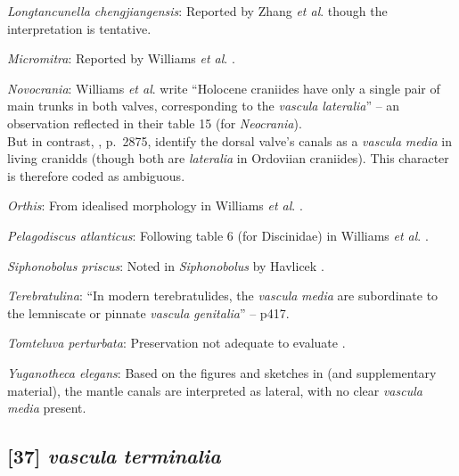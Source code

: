 \documentclass[openany]{book}
\theoremstyle{definition}
\theoremstyle{definition}
\theoremstyle{definition}
\theoremstyle{remark}
\begin{document}
\hypertarget{Longtancunella_chengjiangensis-coding-36}{}
\emph{Longtancunella chengjiangensis}: Reported by Zhang \emph{et al}.
\citeyearpar{Zhang2007Agregarious} though the interpretation is
tentative.

\hypertarget{Micromitra-coding-36}{}
\emph{Micromitra}: Reported by Williams \emph{et al}.
\citeyearpar{Williams1998Thediversity}.

\hypertarget{Novocrania-coding-36}{}
\emph{Novocrania}: Williams \emph{et al}.
\citeyearpar{Williams2000LinguliformeaCraniiformea} write ``Holocene
craniides have only a single pair of main trunks in both valves,
corresponding to the \emph{vascula} \emph{lateralia}'' -- an observation
reflected in their table 15 (for \emph{Neocrania}).\\
But in contrast, \citet{Williams2007Supplement}, p.~2875, identify the
dorsal valve's canals as a \emph{vascula} \emph{media} in living
cranidds (though both are \emph{lateralia} in Ordoviian craniides). This
character is therefore coded as ambiguous.

\hypertarget{Orthis-coding-36}{}
\emph{Orthis}: From idealised morphology in Williams \emph{et al}.
\citeyearpar{Williams2000LinguliformeaCraniiformea}.

\hypertarget{Pelagodiscus_atlanticus-coding-36}{}
\emph{Pelagodiscus atlanticus}: Following table 6 (for Discinidae) in
Williams \emph{et al}.
\citeyearpar{Williams2000LinguliformeaCraniiformea}.

\hypertarget{Siphonobolus_priscus-coding-36}{}
\emph{Siphonobolus priscus}: Noted in \emph{Siphonobolus} by Havlicek
\citeyearpar{Havlicek1982LingulaceaPaterinacea}.

\hypertarget{Terebratulina-coding-36}{}
\emph{Terebratulina}: ``In modern terebratulides, the \emph{vascula}
\emph{media} are subordinate to the lemniscate or pinnate \emph{vascula}
\emph{genitalia}'' -- \citet{Williams1997Introduction} p417.

\hypertarget{Tomteluva_perturbata-coding-36}{}
\emph{Tomteluva perturbata}: Preservation not adequate to evaluate
\citep{Streng2016Anew}.

\hypertarget{Yuganotheca_elegans-coding-36}{}
\emph{Yuganotheca elegans}: Based on the figures and sketches in
\citet{Zhang2014Anearly} (and supplementary material), the mantle canals
are interpreted as lateral, with no clear \emph{vascula} \emph{media}
present.

\subsection*{\texorpdfstring{{[}37{]} \emph{vascula}
\emph{terminalia}}{{[}37{]} vascula terminalia}}\label{vascula-terminalia}
\end{document}
